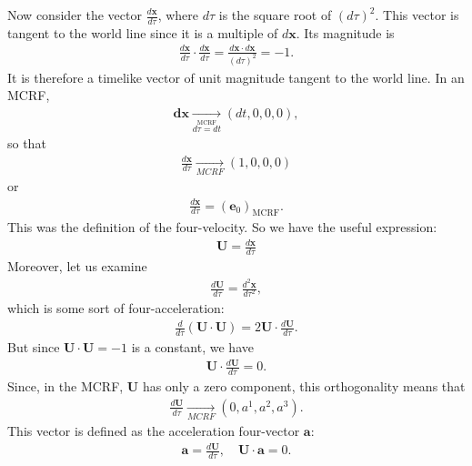 \documentclass[12pt]{book}
\begin{document}
        Now consider the vector \( \frac{d\mathbf{x}}{d\tau} \), where \( d\tau \) is the square root of \((d\tau)^2\). This vector is tangent to the world line since it is a multiple of \( d\mathbf{x} \). Its magnitude is
        \begin{align}
        \frac{d\mathbf{x}}{d\tau} \cdot \frac{d\mathbf{x}}{d\tau} = \frac{d\mathbf{x} \cdot d\mathbf{x}}{(d\tau)^2} = -1.
        \end{align}
        It is therefore a timelike vector of unit magnitude tangent to the world line. In an MCRF,
        \begin{align}
        \mathbf{dx} \underset{\stackrel{\text{MCRF}}{\text{\(d\tau = dt\)}}}{\longrightarrow}(dt, 0, 0, 0),
        \end{align}
        so that
        \begin{align}
        \frac{d\mathbf{x}}{d\tau} \underset{MCRF}{\longrightarrow} (1, 0, 0, 0)
        \end{align}
        or
        \begin{align}
        \frac{d\mathbf{x}}{d\tau} = (\mathbf{e}_0)_{\text{MCRF}}.
        \end{align}
        This was the definition of the four-velocity. So we have the useful expression:
        \begin{align}
        \mathbf{U} = \frac{d\mathbf{x}}{d\tau}
        \end{align}
        Moreover, let us examine
        \begin{align}
        \frac{d\mathbf{U}}{d\tau} = \frac{d^2\mathbf{x}}{d\tau^2},
        \end{align}
        which is some sort of four-acceleration:
        \begin{align}
        \frac{d}{d\tau} (\mathbf{U} \cdot \mathbf{U}) = 2\mathbf{U} \cdot \frac{d\mathbf{U}}{d\tau}.
        \end{align}
        But since \( \mathbf{U} \cdot \mathbf{U} = -1 \) is a constant, we have
        \begin{align}
        \mathbf{U} \cdot \frac{d\mathbf{U}}{d\tau} = 0.
        \end{align}
        Since, in the MCRF, \( \mathbf{U} \) has only a zero component, this orthogonality means that
        \begin{align}
        \frac{d\mathbf{U}}{d\tau} \underset{MCRF}{\longrightarrow} (0, a^1, a^2, a^3).
        \end{align}
        This vector is defined as the acceleration four-vector \( \mathbf{a} \):
        \begin{align}
        \mathbf{a} = \frac{d\mathbf{U}}{d\tau}, \quad \mathbf{U} \cdot \mathbf{a} = 0.
        \end{align}
\end{document}
